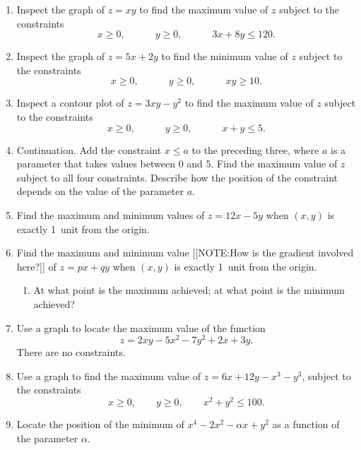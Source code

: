 \begin{enumerate}
\item Inspect the graph of $z = xy$ to find the maximum value of $z$
subject to the constraints
        \[
x \geq 0, \qquad \quad y \geq 0, \qquad \quad 3 x + 8 y \leq 120.
\]


\item Inspect the graph of $z = 5 x + 2 y$ to find the minimum value of
$z$ subject to the constraints
        \[
x \geq 0, \qquad \quad y \geq 0, \qquad \quad xy  \geq 10.
\]


\item Inspect a contour plot of $z = 3xy - y^2$ to find the maximum
value of $z$ subject to the constraints
        \[
x \geq 0, \qquad \quad y \geq 0, \qquad \quad x + y \leq 5.
\]


\item Continuation.  Add the constraint $x \leq a$ to the preceding
three, where $a$ is a parameter that takes values between 0 and 5.
Find the maximum value of $z$ subject to all four constraints.
Describe how the position of the constraint depends on the value of
the parameter $a$.



\item Find the maximum and minimum values of $z = 12 x - 5 y$ when $(x,
y)$ is exactly 1~unit from the origin.


\item Find the maximum and minimum value
        [[NOTE:How is the gradient involved here?]]
of $z = px + qy$ when $(x, y)$ is exactly 1~unit from the origin.

  \begin{enumerate}
  \item At what point is the maximum achieved; at what point is the
minimum achieved?


\end{enumerate}
\item Use a graph to locate the maximum value of the function
        \[
z = 2 x y - 5 x^2 - 7 y^2 + 2 x + 3 y.
\]
There are no constraints.


\item Use a graph to find the maximum value of $z = 6x + 12 y - x^3 -
y^3$, subject to the constraints
        \[
x \geq 0, \qquad y \geq 0, \qquad x^2 + y^2 \leq 100.
\]


\item Locate the position of the minimum of $x^4 - 2 x^2 - \alpha x +
y^2$ as a function of the parameter $\alpha$.


\end{enumerate}
